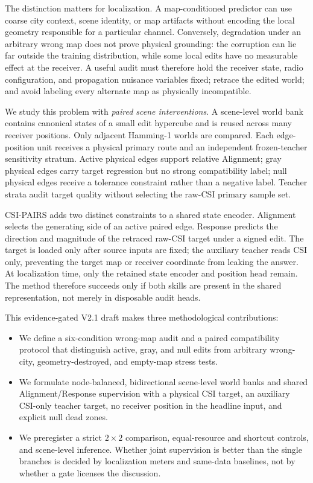 \documentclass{article}
\newcommand{\method}{CSI-PAIRS}
\begin{document}
The distinction matters for localization.  A map-conditioned predictor can use
coarse city context, scene identity, or map artifacts without encoding the
local geometry responsible for a particular channel.  Conversely, degradation
under an arbitrary wrong map does not prove physical grounding: the corruption
can lie far outside the training distribution, while some local edits have no
measurable effect at the receiver.  A useful audit must therefore hold the
receiver state, radio configuration, and propagation nuisance variables fixed;
retrace the edited world; and avoid labeling every alternate map as physically
incompatible.

We study this problem with \emph{paired scene interventions}.  A scene-level
world bank contains canonical states of a small edit hypercube and is reused
across many receiver positions.  Only adjacent Hamming-1 worlds are compared.
Each edge-position unit receives a physical primary route and an independent
frozen-teacher sensitivity stratum.  Active physical edges support relative
Alignment; gray physical edges carry target regression but no strong
compatibility label; null physical edges receive a tolerance constraint rather
than a negative label.  Teacher strata audit target quality without selecting
the raw-CSI primary sample set.

\method{} adds two distinct constraints to a shared state encoder.  Alignment
selects the generating side of an active paired edge.  Response predicts the
direction and magnitude of the retraced raw-CSI target under a signed edit.  The
target is loaded only after source inputs are fixed; the auxiliary teacher reads
CSI only, preventing the target map or receiver coordinate from leaking the answer.
At localization time, only the retained state encoder and
position head remain.  The method therefore succeeds only if both skills are
present in the shared representation, not merely in disposable audit heads.

This evidence-gated V2.1 draft makes three methodological contributions:

\begin{itemize}
    \item We define a six-condition wrong-map audit and a paired compatibility
    protocol that distinguish active, gray, and null edits from arbitrary
    wrong-city, geometry-destroyed, and empty-map stress tests.
    \item We formulate node-balanced, bidirectional scene-level world banks and
    shared Alignment/Response supervision with a physical CSI target, an
    auxiliary CSI-only teacher target, no receiver position in the headline
    input, and explicit null dead zones.
    \item We preregister a strict $2\times2$ comparison, equal-resource and
    shortcut controls, and scene-level inference.  Whether joint supervision
    is better than the single branches is decided by localization meters and
    same-data baselines, not by whether a gate licenses the discussion.
\end{itemize}
\end{document}
